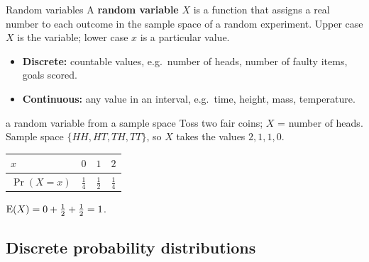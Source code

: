 \begin{cols}
\begin{defn}{Random variables}
A \textbf{random variable} $X$ is a function that assigns a real number to each outcome in the sample space of a random experiment. Upper case $X$ is the variable; lower case $x$ is a particular value.
\begin{itemize}
  \item \textbf{Discrete:} countable values, e.g.\ number of heads, number of faulty items, goals scored.
  \item \textbf{Continuous:} any value in an interval, e.g.\ time, height, mass, temperature.
\end{itemize}
\end{defn}
\nextcol
\begin{example}{a random variable from a sample space}
Toss two fair coins; $X$ = number of heads. Sample space $\{HH,HT,TH,TT\}$, so $X$ takes the values $2,1,1,0$.\par
\begin{tabular}{@{}l|ccc@{}}
$x$ & $0$ & $1$ & $2$\\ \hline
$\Pr(X=x)$ & $\frac14$ & $\frac12$ & $\frac14$
\end{tabular}\par
$\mathrm{E}(X)=0+\frac12+\frac12=1$.
\end{example}
\end{cols}

\subsection{Discrete probability distributions}
\label{sec:discrete}

